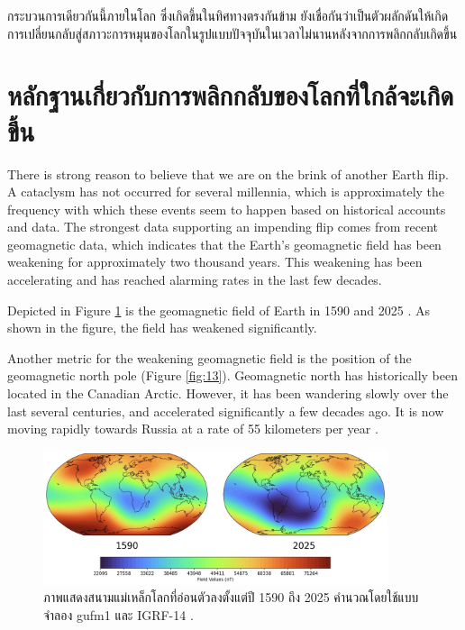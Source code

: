 \documentclass[10pt,twocolumn,letterpaper]{article}
\begin{document}
กระบวนการเดียวกันนี้ภายในโลก ซึ่งเกิดขึ้นในทิศทางตรงกันข้าม ยังเชื่อกันว่าเป็นตัวผลักดันให้เกิดการเปลี่ยนกลับสู่สภาวะการหมุนของโลกในรูปแบบปัจจุบันในเวลาไม่นานหลังจากการพลิกกลับเกิดขึ้น

\section{หลักฐานเกี่ยวกับการพลิกกลับของโลกที่ใกล้จะเกิดขึ้น}
There is strong reason to believe that we are on the brink of another Earth flip. A cataclysm has not occurred for several millennia, which is approximately the frequency with which these events seem to happen based on historical accounts and data. The strongest data supporting an impending flip comes from recent geomagnetic data, which indicates that the Earth's geomagnetic field has been weakening for approximately two thousand years. This weakening has been accelerating and has reached alarming rates in the last few decades.

Depicted in Figure \ref{fig:14} is the geomagnetic field of Earth in 1590 and 2025 \cite{125,126}. As shown in the figure, the field has weakened significantly.

Another metric for the weakening geomagnetic field is the position of the geomagnetic north pole (Figure \ref{fig:13}). Geomagnetic north has historically been located in the Canadian Arctic. However, it has been wandering slowly over the last several centuries, and accelerated significantly a few decades ago. It is now moving rapidly towards Russia at a rate of 55 kilometers per year \cite{124}.

\begin{figure}[t]
\begin{center}
\includegraphics[width=0.9\textwidth]{saa.jpg}
\end{center}
   \caption{ภาพแสดงสนามแม่เหล็กโลกที่อ่อนตัวลงตั้งแต่ปี 1590 ถึง 2025 คำนวณโดยใช้แบบจำลอง gufm1 และ IGRF-14 \cite{125,126}.}
\label{fig:14}
\end{figure}
\end{document}
